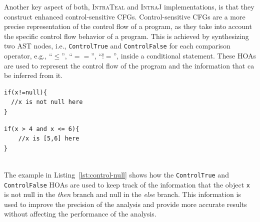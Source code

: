 Another key aspect of both, \textsc{IntraTeal} and \textsc{IntraJ} implementations, is that they 
construct enhanced control-sensitive CFGs. Control-sensitive CFGs
are a more precise representation of the control flow of a program, as they take 
into account the specific control flow behavior of a program. This is achieved by
synthesizing two AST nodes, i.e., \texttt{ControlTrue} and \texttt{ControlFalse} for each
comparison operator, e.g.,  ``$\le$'', ``$==$'', ``$!=$'', inside a conditional statement.
These HOAs are used to represent the control flow of the program and the information that ca be inferred from 
it. \\
%
\begin{minipage}{0.45\textwidth}
    \begin{lstlisting}[language=JastAdd,caption={Control-sensitivity to improve null pointer analysis.}, label={lst:control-null}]
if(x!=null){
  //x is not null here
}
    \end{lstlisting}
    \end{minipage}\hfill%
    \begin{minipage}{0.45\textwidth}
    \begin{lstlisting}[language=JastAdd,caption={Control-sensitivity to improve interval analysis.}, label={lst:control-interval}]
if(x > 4 and x <= 6){
    //x is [5,6] here
}
    \end{lstlisting}
\end{minipage}\\
The example in Listing~\ref{lst:control-null} shows how the \texttt{ControlTrue} and \texttt{ControlFalse}
HOAs are used to keep track of the information that the object \texttt{x} is not null 
in the \emph{then} branch and null in the \emph{else} branch.
This information is used to improve the precision of the analysis and provide 
more accurate results without affecting the performance of the analysis.

